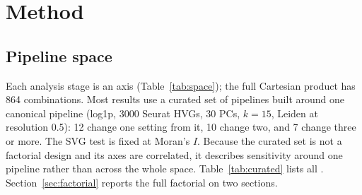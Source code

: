 \section{Method}
\label{sec:method}

\subsection{Pipeline space}
Each analysis stage is an axis (Table~\ref{tab:space}); the full Cartesian
product has 864 combinations. Most results use a curated set of \Nspecs{}
pipelines built around one canonical pipeline (log1p, 3000 Seurat HVGs, 30
PCs, $k=15$, Leiden at resolution 0.5): 12 change one setting from it, 10
change two, and 7 change three or more. The SVG test is fixed at Moran's
$I$. Because the curated set is not a factorial design and its axes are
correlated, it describes sensitivity around one pipeline rather than across
the whole space. Table~\ref{tab:curated} lists all \Nspecs{}. Section~\ref{sec:factorial}
reports the full factorial on two sections.
